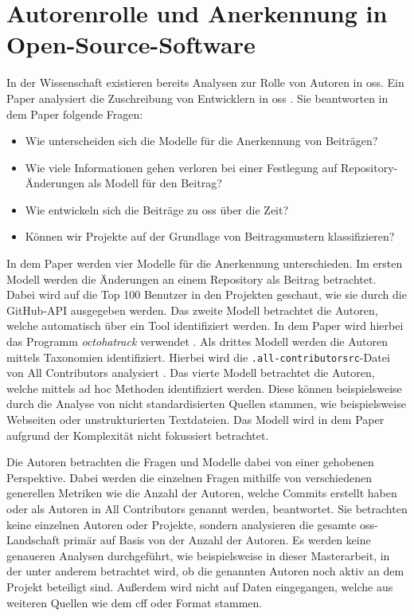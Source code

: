 \section{Autorenrolle und Anerkennung in Open-Source-Software}
\label{sec:autorenrolle-oss}
In der Wissenschaft existieren bereits Analysen zur Rolle von Autoren in \gls{oss}.
Ein Paper analysiert die Zuschreibung von Entwicklern in \gls{oss} \autocite{young_which_2021}.
Sie beantworten in dem Paper folgende Fragen:

\begin{itemize}
  \item Wie unterscheiden sich die Modelle für die Anerkennung von Beiträgen?
  \item Wie viele Informationen gehen verloren bei einer Festlegung auf Repository-Änderungen als Modell für den Beitrag?
  \item Wie entwickeln sich die Beiträge zu \gls{oss} über die Zeit?
  \item Können wir Projekte auf der Grundlage von Beitragsmustern klassifizieren?
\end{itemize}

In dem Paper werden vier Modelle für die Anerkennung unterschieden.
Im ersten Modell werden die Änderungen an einem Repository als Beitrag betrachtet.
Dabei wird auf die Top 100 Benutzer in den Projekten geschaut, wie sie durch die GitHub-API ausgegeben werden.
Das zweite Modell betrachtet die Autoren, welche automatisch über ein Tool identifiziert werden.
In dem Paper wird hierbei das Programm \emph{octohatrack} verwendet \autocites{young_which_2021}{noauthor_labhroctohatrack_2024}.
Als drittes Modell werden die Autoren mittels Taxonomien identifiziert.
Hierbei wird die \texttt{.all-contributorsrc}-Datei von \glqq All Contributors\grqq{} analysiert \autocites{young_which_2021}{all_contributors_recognize_2024}.
Das vierte Modell betrachtet die Autoren, welche mittels ad hoc Methoden identifiziert werden.
Diese können beispielsweise durch die Analyse von nicht standardisierten Quellen stammen, wie beispielsweise Webseiten oder unstrukturierten Textdateien.
Das Modell wird in dem Paper aufgrund der Komplexität nicht fokussiert betrachtet.

Die Autoren betrachten die Fragen und Modelle dabei von einer gehobenen Perspektive.
Dabei werden die einzelnen Fragen mithilfe von verschiedenen generellen Metriken wie die Anzahl der Autoren, welche Commits erstellt haben oder als Autoren in \glqq All Contributors\grqq{} genannt werden, beantwortet.
Sie betrachten keine einzelnen Autoren oder Projekte, sondern analysieren die gesamte \gls{oss}-Landschaft primär auf Basis von der Anzahl der Autoren.
Es werden keine genaueren Analysen durchgeführt, wie beispielsweise in dieser Masterarbeit, in der unter anderem betrachtet wird, ob die genannten Autoren noch aktiv an dem Projekt beteiligt sind.
Außerdem wird nicht auf Daten eingegangen, welche aus weiteren Quellen wie dem \gls{cff} oder  Format stammen.
